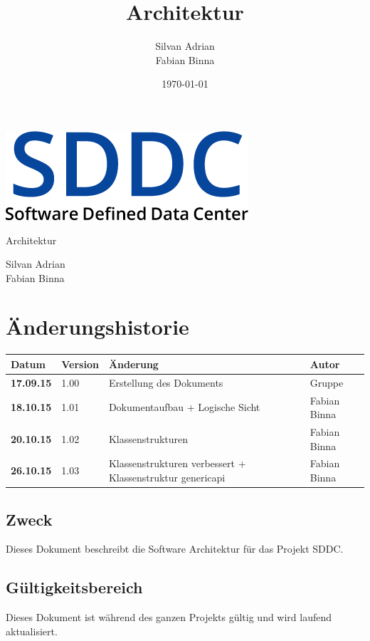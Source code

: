 \documentclass[11pt]{scrartcl}
\title{Architektur}
\author{Silvan Adrian \\ Fabian Binna}
\date{\today{}}
\begin{document}
\def\arraystretch{1.5}
\begin{titlepage}
\begin{center}
\vspace{10em}
\includegraphics[scale=2]{SDDC}
\vspace{10em}
\end{center}
\begin{center}
\huge {Architektur}
\end{center}
\begin{center}
\vspace{10em}
\LARGE {Silvan Adrian} \\
\LARGE {Fabian Binna}
\end{center}

\end{titlepage}

\newpage
\section{Änderungshistorie}
\begin{tabularx}{\linewidth}{l l X l}
\textbf{Datum} & \textbf{Version} & \textbf{Änderung}  & \textbf{Autor} \\
\hline
\textbf{17.09.15} & 1.00 & Erstellung des Dokuments & Gruppe \\
\textbf{18.10.15} & 1.01 & Dokumentaufbau + Logische Sicht & Fabian Binna\\
\textbf{20.10.15} & 1.02 & Klassenstrukturen & Fabian Binna\\
\textbf{26.10.15} & 1.03 & Klassenstrukturen verbessert + Klassenstruktur genericapi & Fabian Binna\\

\end{tabularx}

\newpage
\tableofcontents
\newpage

\subsection{Zweck}
Dieses Dokument beschreibt die Software Architektur für das Projekt SDDC.
\subsection{Gültigkeitsbereich}
Dieses Dokument ist während des ganzen Projekts gültig und wird laufend aktualisiert.
\end{document}
